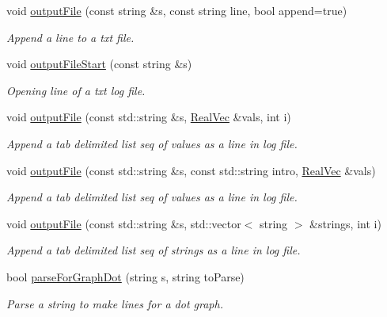 \begin{DoxyCompactItemize}
void \hyperlink{namespacesubpavings_aa5b5b66715568bc59cafea064eb8b1a7}{output\-File} (const string \&s, const string line, bool append=true)
\begin{DoxyCompactList}\small\item\em \-Append a line to a txt file. \end{DoxyCompactList}\item 
void \hyperlink{namespacesubpavings_afb8564fbbb2536bafcd19a5cc56e6531}{output\-File\-Start} (const string \&s)
\begin{DoxyCompactList}\small\item\em \-Opening line of a txt log file. \end{DoxyCompactList}\item 
void \hyperlink{namespacesubpavings_a57aa1d6f86ddd18d459fd36a710ae737}{output\-File} (const std\-::string \&s, \hyperlink{namespacesubpavings_af2d57bb6e12f4a73169f2e496d6a641f}{\-Real\-Vec} \&vals, int i)
\begin{DoxyCompactList}\small\item\em \-Append a tab delimited list seq of values as a line in log file. \end{DoxyCompactList}\item 
void \hyperlink{namespacesubpavings_a11f846091a8b802ae4173e061b1b55f2}{output\-File} (const std\-::string \&s, const std\-::string intro, \hyperlink{namespacesubpavings_af2d57bb6e12f4a73169f2e496d6a641f}{\-Real\-Vec} \&vals)
\begin{DoxyCompactList}\small\item\em \-Append a tab delimited list seq of values as a line in log file. \end{DoxyCompactList}\item 
void \hyperlink{namespacesubpavings_a577225f9ff8ccb0b27420ff962fc978f}{output\-File} (const std\-::string \&s, std\-::vector$<$ string $>$ \&strings, int i)
\begin{DoxyCompactList}\small\item\em \-Append a tab delimited list seq of strings as a line in log file. \end{DoxyCompactList}\item 
bool \hyperlink{namespacesubpavings_a0973b1623e6e12ba060db40d9cceece1}{parse\-For\-Graph\-Dot} (string s, string to\-Parse)
\begin{DoxyCompactList}\small\item\em \-Parse a string to make lines for a dot graph. \end{DoxyCompactList}\item 

\end{DoxyCompactItemize}
